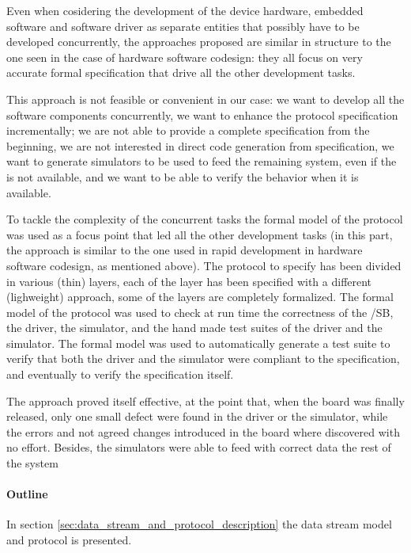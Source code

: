 \documentclass{article} \usepackage{times}
\begin{document}
Even when cosidering the development of the device hardware, embedded
software and software driver as separate entities that possibly have
to be developed concurrently, the approaches proposed are similar in
structure to the one seen in the case of hardware software
codesign\cite{Valderrama1995,Siegmund2002,Ryzhyk2009}: they all focus
on very accurate formal specification that drive all the other
development tasks.

This approach is not feasible or convenient in our case: we want to
develop all the software components concurrently, we want to enhance
the protocol specification incrementally; we are not able to provide a
complete specification from the beginning, we are not interested in
direct code generation from specification, we want to generate
simulators to be used to feed the remaining system, even if the \STSB
is not available, and we want to be able to verify the \STSB behavior
when it is available.

To tackle the complexity of the concurrent tasks the formal model of
the protocol was used as a focus point that led all the other
development tasks (in this part, the approach is similar to the one
used in rapid development in hardware software codesign, as mentioned
above).  The protocol to specify has been divided in various (thin)
layers, each of the layer has been specified with a different
(lighweight) approach, some of the layers are completely formalized.
The formal model of the protocol was used to check at run time the
correctness of the /SB, the driver, the simulator, and the hand made
test suites of the driver and the simulator.  The formal model was
used to automatically generate a test suite to verify that both the
driver and the simulator were compliant to the specification, and
eventually to verify the specification itself.

The approach proved itself effective, at the point that, when the
board was finally released, only one small defect were found in the
driver or the simulator, while the errors and not agreed changes
introduced in the board where discovered with no effort.  Besides, the
simulators were able to feed with correct data the rest of the system

\paragraph*{Outline}

In section \ref{sec:data_stream_and_protocol_description} the data
stream model and protocol is presented.
\end{document}

